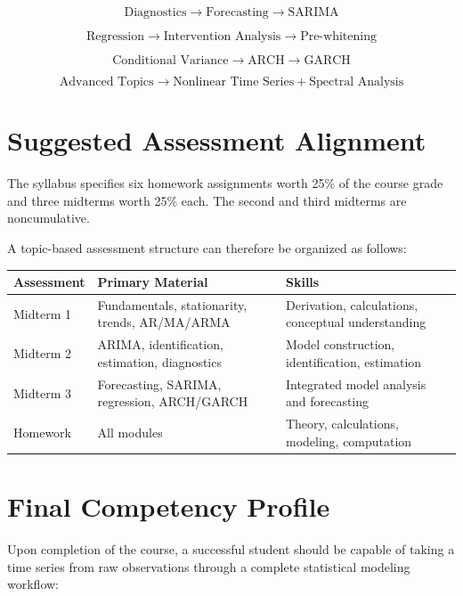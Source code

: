 \documentclass[11pt]{article}
\begin{document}
\[
\boxed{
\text{Diagnostics}
\rightarrow
\text{Forecasting}
\rightarrow
\text{SARIMA}
}
\]

\[
\boxed{
\text{Regression}
\rightarrow
\text{Intervention Analysis}
\rightarrow
\text{Pre-whitening}
}
\]

\[
\boxed{
\text{Conditional Variance}
\rightarrow
\text{ARCH}
\rightarrow
\text{GARCH}
}
\]

\[
\boxed{
\text{Advanced Topics}
\rightarrow
\text{Nonlinear Time Series}
+
\text{Spectral Analysis}
}
\]

\section{Suggested Assessment Alignment}

The syllabus specifies six homework assignments worth 25\% of the
course grade and three midterms worth 25\% each. The second and third
midterms are noncumulative. 

A topic-based assessment structure can therefore be organized as follows:

\begin{longtable}{p{}p{}p{}}
\toprule
\textbf{Assessment} & \textbf{Primary Material} & \textbf{Skills} \\
\midrule
Midterm 1 &
Fundamentals, stationarity, trends, AR/MA/ARMA &
Derivation, calculations, conceptual understanding \\

Midterm 2 &
ARIMA, identification, estimation, diagnostics &
Model construction, identification, estimation \\

Midterm 3 &
Forecasting, SARIMA, regression, ARCH/GARCH &
Integrated model analysis and forecasting \\

Homework &
All modules &
Theory, calculations, modeling, computation \\
\bottomrule
\end{longtable}

\section{Final Competency Profile}

Upon completion of the course, a successful student should be capable
of taking a time series from raw observations through a complete
statistical modeling workflow:
\end{document}
